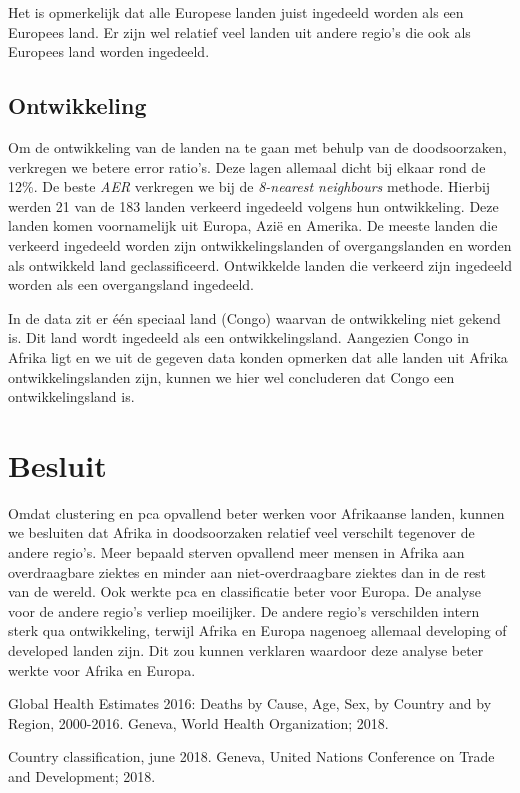 \documentclass[a4paper,kulak]{kulakarticle}
\begin{document}
Het is opmerkelijk dat alle Europese landen juist ingedeeld worden als een Europees land. Er zijn wel relatief veel landen uit andere regio's die ook als Europees land worden ingedeeld. 

\subsection{Ontwikkeling}
Om de ontwikkeling van de landen na te gaan met behulp van de doodsoorzaken, verkregen we betere error ratio's. Deze lagen allemaal dicht bij elkaar rond de 12\%. De beste \textit{AER} verkregen we bij de \textit{8-nearest neighbours} methode. Hierbij werden 21 van de 183 landen verkeerd ingedeeld volgens hun ontwikkeling. Deze landen komen voornamelijk uit Europa, Azi\"e en Amerika. De meeste landen die verkeerd ingedeeld worden zijn ontwikkelingslanden of overgangslanden en worden als ontwikkeld land geclassificeerd. Ontwikkelde landen die verkeerd zijn ingedeeld worden als een overgangsland ingedeeld. 

In de data zit er \'e\'en speciaal land (Congo) waarvan de ontwikkeling niet gekend is. Dit land wordt ingedeeld als een ontwikkelingsland. Aangezien Congo in Afrika ligt en we uit de gegeven data konden opmerken dat alle landen uit Afrika ontwikkelingslanden zijn, kunnen we hier wel concluderen dat Congo een ontwikkelingsland is. 

\section*{Besluit}

Omdat clustering en pca opvallend beter werken voor Afrikaanse landen, kunnen we besluiten dat Afrika in doodsoorzaken relatief veel verschilt tegenover de andere regio's.
Meer bepaald sterven opvallend meer mensen in Afrika aan overdraagbare ziektes en minder aan niet-overdraagbare ziektes dan in de rest van de wereld. 
Ook werkte pca en classificatie beter voor Europa.
De analyse voor de andere regio's verliep moeilijker.
De andere regio's verschilden intern sterk qua ontwikkeling, terwijl Afrika en Europa nagenoeg allemaal developing of developed landen zijn.
Dit zou kunnen verklaren waardoor deze analyse beter werkte voor Afrika en Europa.

\begin{thebibliography}{9}
	
	Global Health Estimates 2016: Deaths by Cause, Age, Sex, by Country and by Region, 2000-2016.
	Geneva, World Health Organization; 2018.
	
	Country classification, june 2018. Geneva, United Nations Conference on Trade and Development;
	2018.
	
\end{thebibliography}
\end{document}
